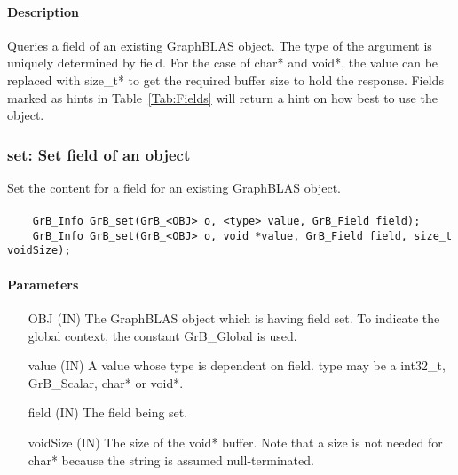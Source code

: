 \paragraph{Description}

Queries a field of an existing GraphBLAS object.
The type of the argument is uniquely determined by {\sf field}.
For the case of {\sf char*} and {\sf void*}, the value can be replaced with {\sf size\_t*}
to get the required buffer size to hold the response.
Fields marked as hints in Table~\ref{Tab:Fields} will return a hint on how best to use the
object.

\subsubsection{{\sf set}: Set field of an object}

Set the content for a field for an existing GraphBLAS object.

\paragraph{\syntax}

\begin{verbatim}
    GrB_Info GrB_set(GrB_<OBJ> o, <type> value, GrB_Field field);
    GrB_Info GrB_set(GrB_<OBJ> o, void *value, GrB_Field field, size_t voidSize);
\end{verbatim}

\paragraph{Parameters}

\begin{itemize}[leftmargin=2.1in]
    \item[{\sf OBJ}] ({\sf IN}) The GraphBLAS object which is having {\sf field} set.
                                To indicate the global context, the constant {\sf GrB\_Global} is used.
    \item[{\sf value}] ({\sf IN}) A value whose type is dependent on {\sf field}.
                                {\sf type} may be a {\sf int32\_t}, {\sf GrB\_Scalar}, {\sf char*} or {\sf void*}.
    \item[{\sf field}] ({\sf IN}) The field being set.
    \item[{\sf voidSize}] ({\sf IN}) The size of the {\sf void*} buffer. Note that a size is not needed for
                                {\sf char*} because the string is assumed null-terminated.
\end{itemize}

